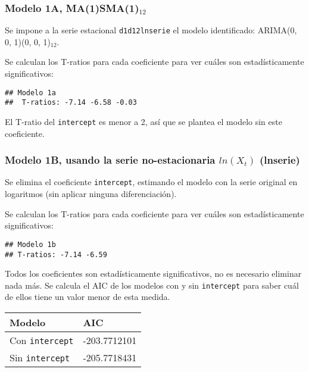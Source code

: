 \documentclass[
]{article}
\begin{document}
\medskip

\hypertarget{modelo-1a-ma1sma1_12}{%
\subsubsection{\texorpdfstring{Modelo 1A,
MA(1)SMA(1)\(_{12}\)}{Modelo 1A, MA(1)SMA(1)\_\{12\}}}\label{modelo-1a-ma1sma1_12}}

Se impone a la serie estacional \texttt{d1d12lnserie} el modelo
identificado: ARIMA(0, 0, 1)(0, 0, 1)\(_{12}\).

Se calculan los T-ratios para cada coeficiente para ver cuáles son
estadísticamente significativos:

\begin{verbatim}
## Modelo 1a 
##  T-ratios: -7.14 -6.58 -0.03
\end{verbatim}

El T-ratio del \texttt{intercept} es menor a 2, así que se plantea el
modelo sin este coeficiente.

\medskip

\hypertarget{modelo-1b-usando-la-serie-no-estacionaria-lnx_t-lnserie}{%
\subsubsection{\texorpdfstring{Modelo 1B, usando la serie
no-estacionaria \(ln(X_t)\)
(lnserie)}{Modelo 1B, usando la serie no-estacionaria ln(X\_t) (lnserie)}}\label{modelo-1b-usando-la-serie-no-estacionaria-lnx_t-lnserie}}

Se elimina el coeficiente \texttt{intercept}, estimando el modelo con la
serie original en logaritmos (sin aplicar ninguna diferenciación).

Se calculan los T-ratios para cada coeficiente para ver cuáles son
estadísticamente significativos:

\begin{verbatim}
## Modelo 1b 
## T-ratios: -7.14 -6.59
\end{verbatim}

Todos los coeficientes son estadísticamente significativos, no es
necesario eliminar nada más. Se calcula el AIC de los modelos con y sin
\texttt{intercept} para saber cuál de ellos tiene un valor menor de esta
medida.

\begin{longtable}[]{@{}ll@{}}
\toprule()
Modelo & AIC \\
\midrule()
\endhead
Con \texttt{intercept} & -203.7712101 \\
Sin \texttt{intercept} & -205.7718431 \\
\bottomrule()
\end{longtable}
\end{document}
